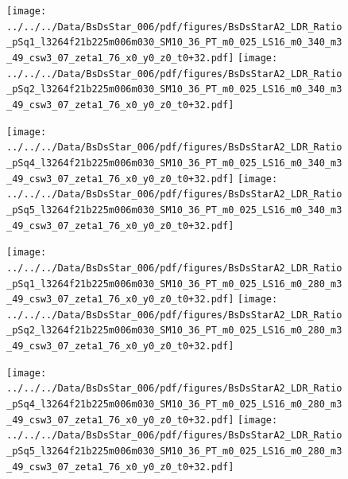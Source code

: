 \documentclass[a4paper,10pt]{article}
\begin{document}
\begin{figure}[p]
 \texttt{[image: ../../../Data/BsDsStar\_006/pdf/figures/BsDsStarA2\_LDR\_Ratio\_pSq1\_l3264f21b225m006m030\_SM10\_36\_PT\_m0\_025\_LS16\_m0\_340\_m3\_49\_csw3\_07\_zeta1\_76\_x0\_y0\_z0\_t0+32.pdf]} 
 \texttt{[image: ../../../Data/BsDsStar\_006/pdf/figures/BsDsStarA2\_LDR\_Ratio\_pSq2\_l3264f21b225m006m030\_SM10\_36\_PT\_m0\_025\_LS16\_m0\_340\_m3\_49\_csw3\_07\_zeta1\_76\_x0\_y0\_z0\_t0+32.pdf]} 
 \end{figure}
\begin{figure}[p]
 \texttt{[image: ../../../Data/BsDsStar\_006/pdf/figures/BsDsStarA2\_LDR\_Ratio\_pSq4\_l3264f21b225m006m030\_SM10\_36\_PT\_m0\_025\_LS16\_m0\_340\_m3\_49\_csw3\_07\_zeta1\_76\_x0\_y0\_z0\_t0+32.pdf]} 
 \texttt{[image: ../../../Data/BsDsStar\_006/pdf/figures/BsDsStarA2\_LDR\_Ratio\_pSq5\_l3264f21b225m006m030\_SM10\_36\_PT\_m0\_025\_LS16\_m0\_340\_m3\_49\_csw3\_07\_zeta1\_76\_x0\_y0\_z0\_t0+32.pdf]} 
 \end{figure}
\begin{figure}[p]
 \texttt{[image: ../../../Data/BsDsStar\_006/pdf/figures/BsDsStarA2\_LDR\_Ratio\_pSq1\_l3264f21b225m006m030\_SM10\_36\_PT\_m0\_025\_LS16\_m0\_280\_m3\_49\_csw3\_07\_zeta1\_76\_x0\_y0\_z0\_t0+32.pdf]} 
 \texttt{[image: ../../../Data/BsDsStar\_006/pdf/figures/BsDsStarA2\_LDR\_Ratio\_pSq2\_l3264f21b225m006m030\_SM10\_36\_PT\_m0\_025\_LS16\_m0\_280\_m3\_49\_csw3\_07\_zeta1\_76\_x0\_y0\_z0\_t0+32.pdf]} 
 \end{figure}
\clearpage
\begin{figure}[p]
 \texttt{[image: ../../../Data/BsDsStar\_006/pdf/figures/BsDsStarA2\_LDR\_Ratio\_pSq4\_l3264f21b225m006m030\_SM10\_36\_PT\_m0\_025\_LS16\_m0\_280\_m3\_49\_csw3\_07\_zeta1\_76\_x0\_y0\_z0\_t0+32.pdf]} 
 \texttt{[image: ../../../Data/BsDsStar\_006/pdf/figures/BsDsStarA2\_LDR\_Ratio\_pSq5\_l3264f21b225m006m030\_SM10\_36\_PT\_m0\_025\_LS16\_m0\_280\_m3\_49\_csw3\_07\_zeta1\_76\_x0\_y0\_z0\_t0+32.pdf]} 
 \end{figure}
\clearpage
\end{document}
